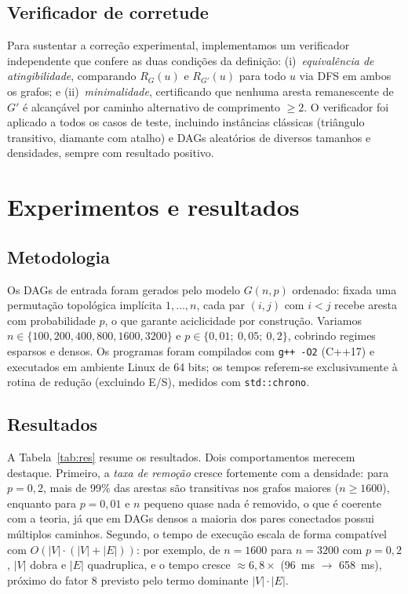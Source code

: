 \documentclass{sbc2023}%
\begin{document}
\subsection{Verificador de corretude}

Para sustentar a correção experimental, implementamos um verificador independente que confere as duas condições da definição: (i)~\emph{equivalência de atingibilidade}, comparando $R_G(u)$ e $R_{G'}(u)$ para todo $u$ via DFS em ambos os grafos; e (ii)~\emph{minimalidade}, certificando que nenhuma aresta remanescente de $G'$ é alcançável por caminho alternativo de comprimento $\geq 2$. O verificador foi aplicado a todos os casos de teste, incluindo instâncias clássicas (triângulo transitivo, diamante com atalho) e DAGs aleatórios de diversos tamanhos e densidades, sempre com resultado positivo.

\section{Experimentos e resultados}
\label{sec:exp}

\subsection{Metodologia}

Os DAGs de entrada foram gerados pelo modelo $G(n,p)$ ordenado: fixada uma permutação topológica implícita $1,\dots,n$, cada par $(i,j)$ com $i<j$ recebe aresta com probabilidade $p$, o que garante aciclicidade por construção. Variamos $n \in \{100, 200, 400, 800, 1600, 3200\}$ e $p \in \{0{,}01;\ 0{,}05;\ 0{,}2\}$, cobrindo regimes esparsos e densos. Os programas foram compilados com \texttt{g++ -O2} (C++17) e executados em ambiente Linux de 64 bits; os tempos referem-se exclusivamente à rotina de redução (excluindo E/S), medidos com \texttt{std::chrono}.

\subsection{Resultados}

A Tabela~\ref{tab:res} resume os resultados. Dois comportamentos merecem destaque. Primeiro, a \emph{taxa de remoção} cresce fortemente com a densidade: para $p=0{,}2$, mais de 99\% das arestas são transitivas nos grafos maiores ($n \geq 1600$), enquanto para $p=0{,}01$ e $n$ pequeno quase nada é removido, o que é coerente com a teoria, já que em DAGs densos a maioria dos pares conectados possui múltiplos caminhos. Segundo, o tempo de execução escala de forma compatível com $O(|V|\cdot(|V|+|E|))$: por exemplo, de $n=1600$ para $n=3200$ com $p=0{,}2$, $|V|$ dobra e $|E|$ quadruplica, e o tempo cresce $\approx 6{,}8\times$ (96~ms $\to$ 658~ms), próximo do fator 8 previsto pelo termo dominante $|V|\cdot|E|$.
\end{document}
